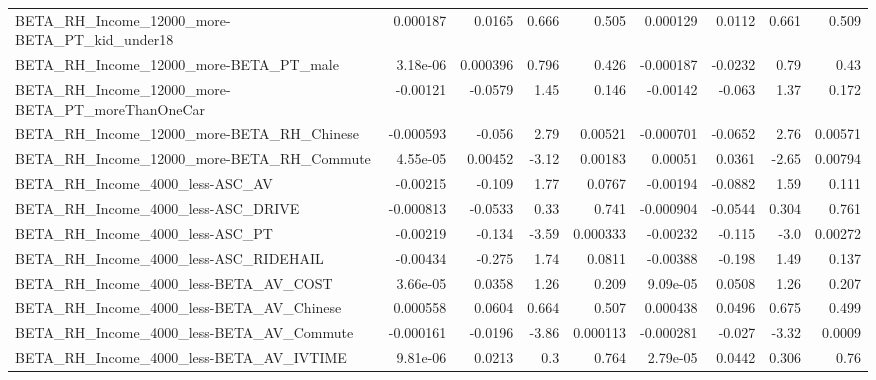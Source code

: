 \begin{tabular}{lrrrrrrrr}
BETA\_RH\_Income\_12000\_more-BETA\_PT\_kid\_under18      &    0.000187 &       0.0165 &    0.666 &    0.505 &   0.000129 &      0.0112 &        0.661 &         0.509 \\
BETA\_RH\_Income\_12000\_more-BETA\_PT\_male             &    3.18e-06 &     0.000396 &    0.796 &    0.426 &  -0.000187 &     -0.0232 &         0.79 &          0.43 \\
BETA\_RH\_Income\_12000\_more-BETA\_PT\_moreThanOneCar   &    -0.00121 &      -0.0579 &     1.45 &    0.146 &   -0.00142 &      -0.063 &         1.37 &         0.172 \\
BETA\_RH\_Income\_12000\_more-BETA\_RH\_Chinese          &   -0.000593 &       -0.056 &     2.79 &  0.00521 &  -0.000701 &     -0.0652 &         2.76 &       0.00571 \\
BETA\_RH\_Income\_12000\_more-BETA\_RH\_Commute          &    4.55e-05 &      0.00452 &    -3.12 &  0.00183 &    0.00051 &      0.0361 &        -2.65 &       0.00794 \\
BETA\_RH\_Income\_4000\_less-ASC\_AV                    &    -0.00215 &       -0.109 &     1.77 &   0.0767 &   -0.00194 &     -0.0882 &         1.59 &         0.111 \\
BETA\_RH\_Income\_4000\_less-ASC\_DRIVE                 &   -0.000813 &      -0.0533 &     0.33 &    0.741 &  -0.000904 &     -0.0544 &        0.304 &         0.761 \\
BETA\_RH\_Income\_4000\_less-ASC\_PT                    &    -0.00219 &       -0.134 &    -3.59 & 0.000333 &   -0.00232 &      -0.115 &         -3.0 &       0.00272 \\
BETA\_RH\_Income\_4000\_less-ASC\_RIDEHAIL              &    -0.00434 &       -0.275 &     1.74 &   0.0811 &   -0.00388 &      -0.198 &         1.49 &         0.137 \\
BETA\_RH\_Income\_4000\_less-BETA\_AV\_COST              &    3.66e-05 &       0.0358 &     1.26 &    0.209 &   9.09e-05 &      0.0508 &         1.26 &         0.207 \\
BETA\_RH\_Income\_4000\_less-BETA\_AV\_Chinese           &    0.000558 &       0.0604 &    0.664 &    0.507 &   0.000438 &      0.0496 &        0.675 &         0.499 \\
BETA\_RH\_Income\_4000\_less-BETA\_AV\_Commute           &   -0.000161 &      -0.0196 &    -3.86 & 0.000113 &  -0.000281 &      -0.027 &        -3.32 &        0.0009 \\
BETA\_RH\_Income\_4000\_less-BETA\_AV\_IVTIME            &    9.81e-06 &       0.0213 &      0.3 &    0.764 &   2.79e-05 &      0.0442 &        0.306 &          0.76 \\

\end{tabular}

